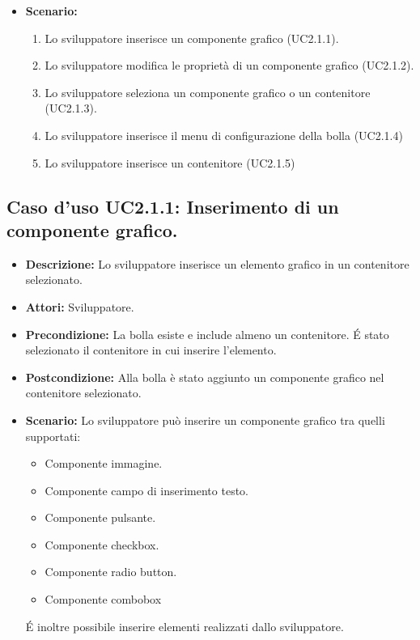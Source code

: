 \begin{itemize}
\item[]\textbf{Scenario:}
\begin{enumerate}
\item Lo sviluppatore inserisce un componente grafico (UC2.1.1).
\item Lo sviluppatore modifica le proprietà di un componente grafico (UC2.1.2).
\item Lo sviluppatore seleziona un componente grafico o un contenitore (UC2.1.3).
\item Lo sviluppatore inserisce il menu di configurazione della bolla (UC2.1.4)
\item Lo sviluppatore inserisce un contenitore (UC2.1.5)
\end{enumerate}
 
\end{itemize}

\subsection{Caso d'uso UC2.1.1: Inserimento di un componente grafico.}
\begin{itemize}
\item[]\textbf{Descrizione:} Lo sviluppatore inserisce un elemento grafico in un contenitore selezionato.
\item[]\textbf{Attori:} Sviluppatore. 
\item[]\textbf{Precondizione:} La bolla esiste e include almeno un contenitore. \'E stato selezionato il contenitore in cui inserire l'elemento. 
\item[]\textbf{Postcondizione:} Alla bolla è stato aggiunto un componente grafico nel contenitore selezionato. 
\item[]\textbf{Scenario:}
 Lo sviluppatore può inserire un componente grafico tra quelli supportati: \begin{itemize}
\item Componente immagine.
\item Componente campo di inserimento testo.
\item Componente pulsante.
\item Componente checkbox.
\item Componente radio button. 
\item Componente combobox
\end{itemize} 
\'E inoltre possibile inserire elementi realizzati dallo sviluppatore. 
\end{itemize}

\clearpage

